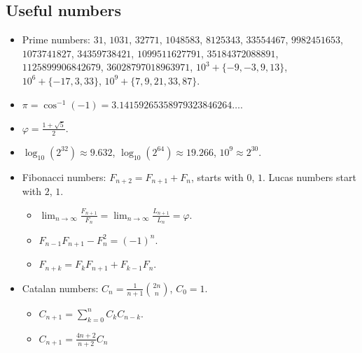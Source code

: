 \subsection{Useful numbers}

\begin{itemize}
    \item Prime numbers: $31$, $1031$, $32771$, $1048583$, $8125343$, $33554467$, $9982451653$, $1073741827$, $34359738421$, $1099511627791$, $35184372088891$, $1125899906842679$, $36028797018963971$, $10^3 + \{-9,-3,9,13\}$, $10^6 + \{-17,3,33\}$, $10^9 + \{7,9,21,33,87\}$.
    \item $\pi = \cos^{-1}(-1) = 3.14159265358979323846264\dots$.
    \item $\varphi = \frac{1 + \sqrt5}{2}$.
    \item $\log_{10}(2^{32}) \approx 9.632$, $\log_{10}(2^{64}) \approx 19.266$, $10^9 \approx 2^{30}$.
    \item Fibonacci numbers: $F_{n+2} = F_{n+1} + F_n$, starts with $0$, $1$. Lucas numbers start with $2$, $1$.
    \begin{itemize}
        \item $\lim_{n \to \infty} \frac{F_{n+1}}{F_n} = \lim_{n \to \infty} \frac{L_{n+1}}{L_n} = \varphi$.
        \item $F_{n-1}F_{n+1} - F_n^2 = (-1)^n$.
        \item $F_{n+k} = F_kF_{n+1} + F_{k-1}F_n$.
    \end{itemize}
    \item Catalan numbers: $C_n = \frac1{n + 1}\binom{2n}n$, $C_0 = 1$.
    \begin{itemize}
        \item $C_{n+1} = \sum_{k=0}^n C_kC_{n-k}$.
        \item $C_{n+1} = \frac{4n + 2}{n + 2}C_n$
    \end{itemize}
\end{itemize}

